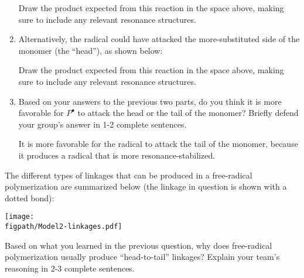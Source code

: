 \begin{activity}
\begin{ctqs}
\begin{enumerate}
			\begin{solution}[1.2in]\end{solution}
			
				Draw the product expected from this reaction in the space above, making sure to include any relevant resonance structures.
				
				\vspace{12pt}
			\item Alternatively, the radical could have attacked the more-substituted side of the monomer (the ``head''), as shown below:
	
			\begin{solution}[1.2in]\end{solution}
			
				Draw the product expected from this reaction in the space above, making sure to include any relevant resonance structures.
				
				\vspace{12pt}
			\item Based on your answers to the previous two parts, do you think it is more favorable for $P^\bullet$ to attack the head or the tail of the monomer?  Briefly defend your group's answer in 1-2 complete sentences.
				
				\begin{solution}[1.5in]
					It is more favorable for the radical to attack the tail of the monomer, because it produces a radical that is more resonance-stabilized.
				\end{solution}
		\end{enumerate}
		
		\question The different types of linkages that can be produced in a free-radical polymerization are summarized below (the linkage in question is shown with a dotted bond):
	
			\centerline{\texttt{[image: \\figpath/Model2-linkages.pdf]}}
			
				Based on what you learned in the previous question, why does free-radical polymerization usually produce ``head-to-tail'' linkages?  Explain your team's reasoning in 2-3 complete sentences.
				

\end{ctqs}
\end{activity}
